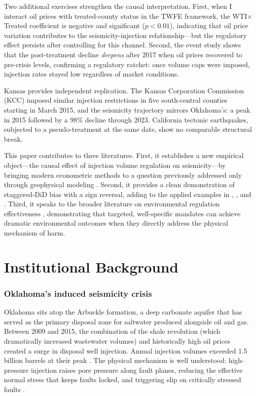 \documentclass[12pt]{article}
\begin{document}
Two additional exercises strengthen the causal interpretation. First, when I interact oil prices with treated-county status in the TWFE framework, the WTI$\times$Treated coefficient is negative and significant ($p < 0.01$), indicating that oil price variation contributes to the seismicity-injection relationship---but the regulatory effect persists after controlling for this channel. Second, the event study shows that the post-treatment decline \textit{deepens} after 2017 when oil prices recovered to pre-crisis levels, confirming a regulatory ratchet: once volume caps were imposed, injection rates stayed low regardless of market conditions.

Kansas provides independent replication. The Kansas Corporation Commission (KCC) imposed similar injection restrictions in five south-central counties starting in March 2015, and the seismicity trajectory mirrors Oklahoma's: a peak in 2015 followed by a 98\% decline through 2023. California tectonic earthquakes, subjected to a pseudo-treatment at the same date, show no comparable structural break.

This paper contributes to three literatures. First, it establishes a new empirical object---the causal effect of injection volume regulation on seismicity---by bringing modern econometric methods to a question previously addressed only through geophysical modeling \citep{langenbruch2018responsible, shirzaei2016surface}. Second, it provides a clean demonstration of staggered-DiD bias with a sign reversal, adding to the applied examples in \citet{goodmanbacon2021difference}, \citet{sun2021estimating}, and \citet{baker2022much}. Third, it speaks to the broader literature on environmental regulation effectiveness \citep{greenstone2003estimating, deschenes2017defensive, currie2014environmental}, demonstrating that targeted, well-specific mandates can achieve dramatic environmental outcomes when they directly address the physical mechanism of harm.

\section{Institutional Background}

\subsubsection*{Oklahoma's induced seismicity crisis} Oklahoma sits atop the Arbuckle formation, a deep carbonate aquifer that has served as the primary disposal zone for saltwater produced alongside oil and gas. Between 2009 and 2015, the combination of the shale revolution (which dramatically increased wastewater volumes) and historically high oil prices created a surge in disposal well injection. Annual injection volumes exceeded 1.5 billion barrels at their peak \citep{murray2015oklahoma}. The physical mechanism is well understood: high-pressure injection raises pore pressure along fault planes, reducing the effective normal stress that keeps faults locked, and triggering slip on critically stressed faults \citep{ellsworth2013injection, keranen2014sharp}.
\end{document}
